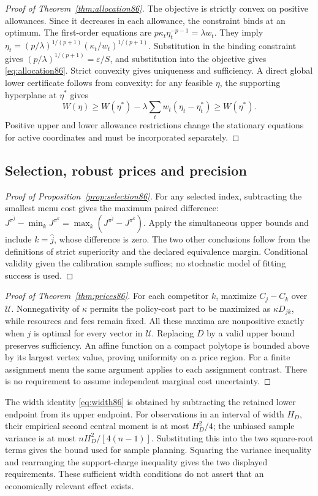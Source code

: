\begin{proof}[Proof of Theorem~\ref{thm:allocation86}]
The objective is strictly convex on positive allowances. Since it decreases in each allowance, the constraint binds at an optimum. The first-order equations are $p\kappa_t\eta_t^{-p-1}=\lambda w_t$. They imply $\eta_t=(p/\lambda)^{1/(p+1)}(\kappa_t/w_t)^{1/(p+1)}$. Substitution in the binding constraint gives $(p/\lambda)^{1/(p+1)}=\varepsilon/S$, and substitution into the objective gives \eqref{eq:allocation86}. Strict convexity gives uniqueness and sufficiency. A direct global lower certificate follows from convexity: for any feasible $\eta$, the supporting hyperplane at $\eta^*$ gives
\[
 W(\eta)\ge W(\eta^*)-\lambda\sum_tw_t(\eta_t-\eta_t^*)
 \ge W(\eta^*).
\]
Positive upper and lower allowance restrictions change the stationary equations for active coordinates and must be incorporated separately.
\end{proof}

\subsection{Selection, robust prices and precision}
\begin{proof}[Proof of Proposition~\ref{prop:selection86}]
For any selected index, subtracting the smallest menu cost gives the maximum paired difference: $J^{\pi^{\widehat j}}-\min_kJ^{\pi^k}=\max_k(J^{\pi^{\widehat j}}-J^{\pi^k})$. Apply the simultaneous upper bounds and include $k=\widehat j$, whose difference is zero. The two other conclusions follow from the definitions of strict superiority and the declared equivalence margin. Conditional validity given the calibration sample suffices; no stochastic model of fitting success is used.
\end{proof}

\begin{proof}[Proof of Theorem~\ref{thm:prices86}]
For each competitor $k$, maximize $C_j-C_k$ over $\mathcal U$. Nonnegativity of $\kappa$ permits the policy-cost part to be maximized as $\kappa D_{jk}$, while resources and fees remain fixed. All these maxima are nonpositive exactly when $j$ is optimal for every vector in $\mathcal U$. Replacing $D$ by a valid upper bound preserves sufficiency. An affine function on a compact polytope is bounded above by its largest vertex value, proving uniformity on a price region. For a finite assignment menu the same argument applies to each assignment contrast. There is no requirement to assume independent marginal cost uncertainty.
\end{proof}

The width identity \eqref{eq:width86} is obtained by subtracting the retained lower endpoint from its upper endpoint. For observations in an interval of width $H_D$, their empirical second central moment is at most $H_D^2/4$; the unbiased sample variance is at most $nH_D^2/[4(n-1)]$. Substituting this into the two square-root terms gives the bound used for sample planning. Squaring the variance inequality and rearranging the support-charge inequality gives the two displayed requirements. These sufficient width conditions do not assert that an economically relevant effect exists.
